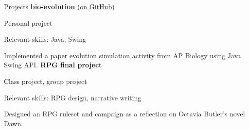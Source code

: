 \begin{rubric}{Projects}
	\textbf{bio-evolution} \href{https://github.com/cephcyn/bio-evolution}{(on GitHub)}
	\par Personal project
	\par Relevant skills: Java, Swing
	\par Implemented a paper evolution simulation activity from AP Biology using Java Swing API.
\entry*[2017] %
	\textbf{RPG final project} %
	\par Class project, group project
	\par Relevant skills: RPG design, narrative writing
	\par Designed an RPG ruleset and campaign as a reflection on Octavia Butler's novel Dawn.
\end{rubric}